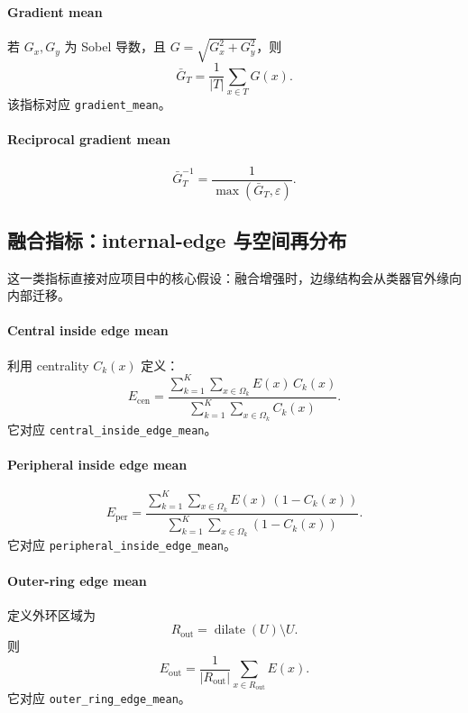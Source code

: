 \documentclass[11pt]{article}
\newcommand{\1}{\mathbf{1}}
\newcommand{\dilate}{\operatorname{dilate}}
\newcommand{\unionmask}{U}
\newcommand{\edgefield}{E}
\begin{document}
\paragraph{Gradient mean}
若 $G_x,G_y$ 为 Sobel 导数，且 $G=\sqrt{G_x^2+G_y^2}$，则
\begin{equation}
\bar{G}_T = \frac{1}{|T|}\sum_{x\in T} G(x).
\end{equation}
该指标对应 \texttt{gradient\_mean}。

\paragraph{Reciprocal gradient mean}
\begin{equation}
\bar{G}_T^{-1} = \frac{1}{\max(\bar{G}_T,\varepsilon)}.
\end{equation}

\subsection{融合指标：internal-edge 与空间再分布}
这一类指标直接对应项目中的核心假设：融合增强时，边缘结构会从类器官外缘向内部迁移。

\paragraph{Central inside edge mean}
利用 centrality $C_k(x)$ 定义：
\begin{equation}
E_{\mathrm{cen}} = \frac{\sum_{k=1}^{K}\sum_{x\in\Omega_k} \edgefield(x)\,C_k(x)}{\sum_{k=1}^{K}\sum_{x\in\Omega_k} C_k(x)}.
\end{equation}
它对应 \texttt{central\_inside\_edge\_mean}。

\paragraph{Peripheral inside edge mean}
\begin{equation}
E_{\mathrm{per}} = \frac{\sum_{k=1}^{K}\sum_{x\in\Omega_k} \edgefield(x)\,(1-C_k(x))}{\sum_{k=1}^{K}\sum_{x\in\Omega_k} (1-C_k(x))}.
\end{equation}
它对应 \texttt{peripheral\_inside\_edge\_mean}。

\paragraph{Outer-ring edge mean}
定义外环区域为
\begin{equation}
R_{\mathrm{out}} = \dilate(\unionmask) \setminus \unionmask.
\end{equation}
则
\begin{equation}
E_{\mathrm{out}} = \frac{1}{|R_{\mathrm{out}}|}\sum_{x\in R_{\mathrm{out}}} \edgefield(x).
\end{equation}
它对应 \texttt{outer\_ring\_edge\_mean}。
\end{document}
